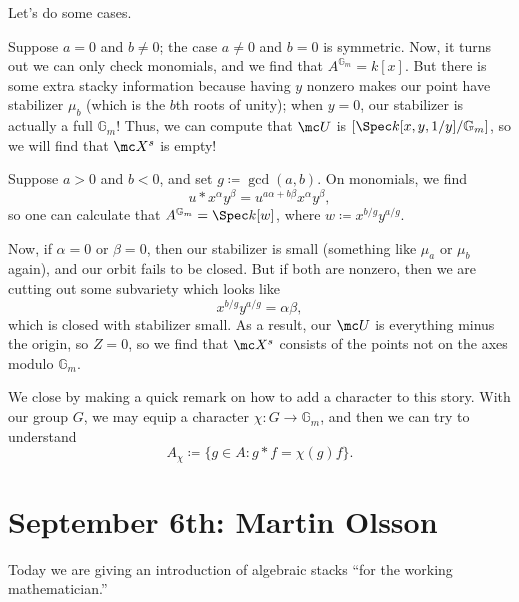 \documentclass{article}
\begin{document}
Let's do some cases.
\begin{listalph}
    \item Suppose $a=0$ and $b\ne0$; the case $a\ne0$ and $b=0$ is symmetric. Now, it turns out we can only check monomials, and we find that $A^{\mathbb G_m}=k[x]$. But there is some extra stacky information because having $y$ nonzero makes our point have stabilizer $\mu_b$ (which is the $b$th roots of unity); when $y=0$, our stabilizer is actually a full $\mathbb G_m$! Thus, we can compute that $\mc U$ is $[\Spec k[x,y,1/y]/\mathbb G_m]$, so we will find that $\mc X^s$ is empty!

    \item Suppose $a>0$ and $b<0$, and set $g\coloneqq\gcd(a,b)$. On monomials, we find
    \[u*x^\alpha y^\beta=u^{a\alpha+b\beta}x^\alpha y^\beta,\]
    so one can calculate that $A^{\mathbb G_m}=\Spec k[w]$, where $w\coloneqq x^{b/g}y^{a/g}$.

    Now, if $\alpha=0$ or $\beta=0$, then our stabilizer is small (something like $\mu_a$ or $\mu_b$ again), and our orbit fails to be closed. But if both are nonzero, then we are cutting out some subvariety which looks like
    \[x^{b/g}y^{a/g}=\alpha\beta,\]
    which is closed with stabilizer small. As a result, our $\mc U$ is everything minus the origin, so $Z=0$, so we find that $\mc X^s$ consists of the points not on the axes modulo $\mathbb G_m$.
\end{listalph}
\begin{remark}
    We close by making a quick remark on how to add a character to this story. With our group $G$, we may equip a character $\chi\colon G\to\mathbb G_m$, and then we can try to understand
    \[A_\chi\coloneqq\{g\in A:g*f=\chi(g)f\}.\]
\end{remark}

\section{September 6th: Martin Olsson}
Today we are giving an introduction of algebraic stacks ``for the working mathematician.''
\end{document}
